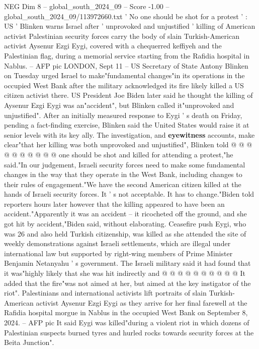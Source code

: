 \begin{textsample}{NEG Dim 8 – global\_south\_2024\_09 – Score -1.00 – global\_south\_2024\_09/113972660.txt}  \label{ex:f8_neg_207}
' No one should be shot for a protest ' : US ' Blinken warns Israel after ' unprovoked and unjustified ' killing of American activist Palestinian security forces carry the body of slain Turkish-American activist Aysenur Ezgi Eygi, covered with a chequerred keffiyeh and the Palestinian flag, during a memorial service starting from the Rafidia hospital in Nablus. -- AFP pic LONDON, Sept 11 -- US Secretary of State Antony Blinken on Tuesday urged Israel to make"fundamental changes"in its operations in the occupied West Bank after the military acknowledged its fire likely killed a US citizen activist there.
US President Joe Biden later said he thought the killing of Aysenur Ezgi Eygi was an"accident", but Blinken called it"unprovoked and unjustified".
After an initially measured response to Eygi ' s death on Friday, pending a fact-finding exercise, Blinken said the United States would raise it at senior levels with its key ally.
The investigation, and \textbf{eyewitness} accounts, make clear"that her killing was both unprovoked and unjustified", Blinken told @ @ @ @ @ @ @ @ @ @ one should be shot and killed for attending a protest,"he said."In our judgement, Israeli security forces need to make some fundamental changes in the way that they operate in the West Bank, including changes to their rules of engagement."We have the second American citizen killed at the hands of Israeli security forces.
It ' s not acceptable.
It has to change."Biden told reporters hours later however that the killing appeared to have been an accident."Apparently it was an accident -- it ricocheted off the ground, and she got hit by accident,"Biden said, without elaborating.
Ceasefire push Eygi, who was 26 and also held Turkish citizenship, was killed as she attended the site of weekly demonstrations against Israeli settlements, which are illegal under international law but supported by right-wing members of Prime Minister Benjamin Netanyahu ' s government.
The Israeli military said it had found that it was"highly likely that she was hit indirectly and @ @ @ @ @ @ @ @ @ @ It added that the fire"was not aimed at her, but aimed at the key instigator of the riot".
Palestinians and international activists lift portraits of slain Turkish-American activist Aysenur Ezgi Eygi as they arrive for her final farewell at the Rafidia hospital morgue in Nablus in the occupied West Bank on September 8, 2024. -- AFP pic It said Eygi was killed"during a violent riot in which dozens of Palestinian suspects burned tyres and hurled rocks towards security forces at the Beita Junction".

\end{textsample}
